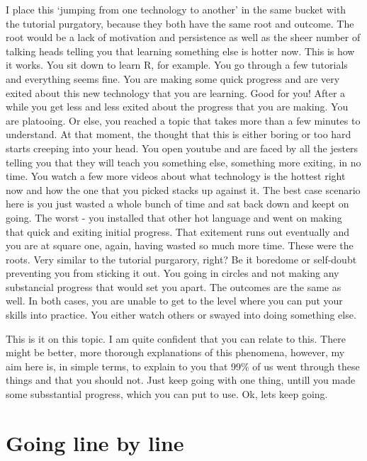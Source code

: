 \documentclass[]{book}
\begin{document}
I place this `jumping from one technology to another' in the same bucket with the tutorial purgatory, because they both have the same root and outcome. The root would be a lack of motivation and persistence as well as the sheer number of talking heads telling you that learning something else is hotter now. This is how it works. You sit down to learn R, for example. You go through a few tutorials and everything seems fine. You are making some quick progress and are very exited about this new technology that you are learning. Good for you! After a while you get less and less exited about the progress that you are making. You are platooing. Or else, you reached a topic that takes more than a few minutes to understand. At that moment, the thought that this is either boring or too hard starts creeping into your head. You open youtube and are faced by all the jesters telling you that they will teach you something else, something more exiting, in no time. You watch a few more videos about what technology is the hottest right now and how the one that you picked stacks up against it. The best case scenario here is you just wasted a whole bunch of time and sat back down and keept on going. The worst - you installed that other hot language and went on making that quick and exiting initial progress. That exitement runs out eventually and you are at square one, again, having wasted so much more time. These were the roots. Very similar to the tutorial purgarory, right? Be it boredome or self-doubt preventing you from sticking it out. You going in circles and not making any substancial progress that would set you apart. The outcomes are the same as well. In both cases, you are unable to get to the level where you can put your skills into practice. You either watch others or swayed into doing something else.

This is it on this topic. I am quite confident that you can relate to this. There might be better, more thorough explanations of this phenomena, however, my aim here is, in simple terms, to explain to you that 99\% of us went through these things and that you should not. Just keep going with one thing, untill you made some subsstantial progress, which you can put to use. Ok, lets keep going.

\hypertarget{going-line-by-line}{%
\section{Going line by line}\label{going-line-by-line}}
\end{document}
